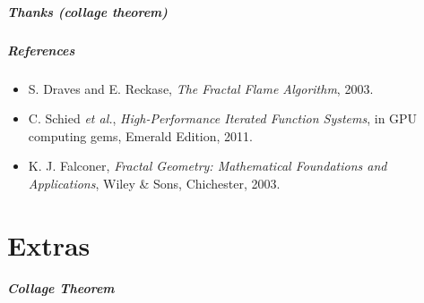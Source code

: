\documentclass{beamer}
\begin{document}
\begin{frame}
  \frametitle{Thanks (collage theorem)}
\end{frame}

\begin{frame}
  \frametitle{References}
  \begin{itemize}
    \item
      S. Draves and E. Reckase, \textit{The Fractal Flame Algorithm}, 2003.
    \item
      C. Schied \textit{et al.}, \textit{High-Performance Iterated Function 
      Systems}, in GPU computing gems, Emerald Edition, 2011.
    \item
      K. J. Falconer, \textit{Fractal Geometry: Mathematical Foundations and 
      Applications}, Wiley \& Sons, Chichester, 2003.
  \end{itemize}
%  
%  
\end{frame}



\part{Extras}

\begin{frame}
  \frametitle{Collage Theorem}
\end{frame}
\end{document}
